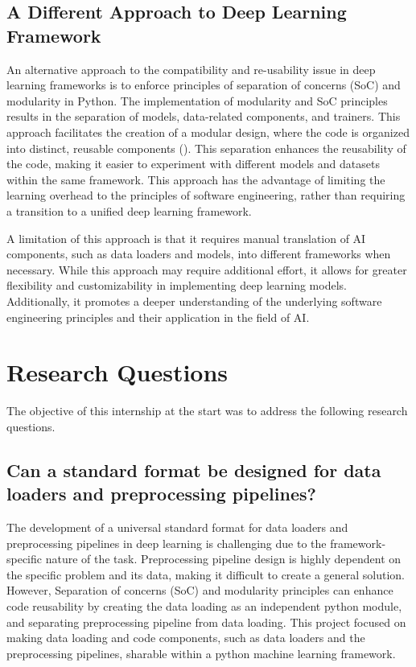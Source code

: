 \documentclass{article}
\begin{document}
\subsection{A Different Approach to Deep Learning Framework}

An alternative approach to the compatibility and re-usability issue in deep learning frameworks is to enforce principles of separation of concerns (SoC) and modularity in Python. 
The implementation of modularity and SoC principles results in the separation of models, data-related components, and trainers. 
This approach facilitates the creation of a modular design, where the code is organized into distinct, reusable components (\cite{sanner1999python,pressman2010software}). This separation enhances the reusability of the code, making it easier to experiment with different models and datasets within the same framework. This approach has the advantage of limiting the learning overhead to the principles of software engineering, rather than requiring a transition to a unified deep learning framework.



A limitation of this approach is that it requires manual translation of AI components, such as data loaders and models, into different frameworks when necessary. While this approach may require additional effort, it allows for greater flexibility and customizability in implementing deep learning models. Additionally, it promotes a deeper understanding of the underlying software engineering principles and their application in the field of AI.



\section{Research Questions}

The objective of this internship at the start was to address the following research questions.

\subsection{Can a standard format be designed for data loaders and preprocessing pipelines?}
{
The development of a universal standard format for data loaders and preprocessing pipelines in deep learning is challenging due to the framework-specific nature of the task. Preprocessing pipeline design is highly dependent on the specific problem and its data, making it difficult to create a general solution. However, Separation of concerns (SoC) and modularity principles can enhance code reusability by creating the data loading as an independent python module, and separating preprocessing pipeline from data loading. This project focused on making data loading and code components, such as data loaders and the preprocessing pipelines, sharable within a python machine learning framework.
}
\end{document}
